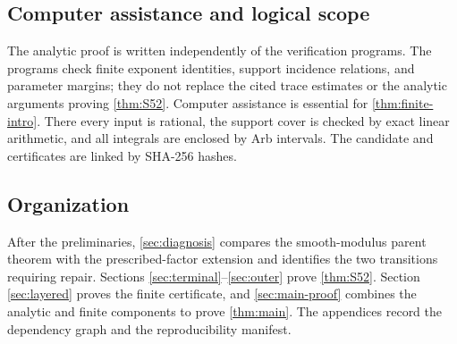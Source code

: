 \subsection{Computer assistance and logical scope}

The analytic proof is written independently of the verification programs.
The programs check finite exponent identities, support incidence relations,
and parameter margins; they do not replace the cited trace estimates or the
analytic arguments proving \cref{thm:S52}.  Computer assistance is essential
for \cref{thm:finite-intro}.  There every input is rational, the support cover
is checked by exact linear arithmetic, and all integrals are enclosed by Arb
intervals.  The candidate and certificates are linked by SHA-256 hashes.

\subsection{Organization}

After the preliminaries, \cref{sec:diagnosis} compares the smooth-modulus
parent theorem with the prescribed-factor extension and identifies the two
transitions requiring repair.  Sections \ref{sec:terminal}--\ref{sec:outer}
prove \cref{thm:S52}.  Section \ref{sec:layered} proves the finite certificate,
and \cref{sec:main-proof} combines the analytic and finite components to prove
\cref{thm:main}.  The appendices record the dependency graph and the
reproducibility manifest.
